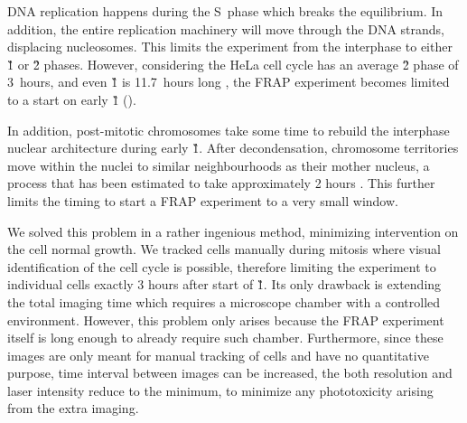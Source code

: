       DNA replication happens during the S~phase which breaks the equilibrium.
      In addition, the entire replication machinery will move through the DNA
      strands, displacing nucleosomes. This limits the experiment from the
      interphase to either \G1{} or \G2{} phases. However, considering
      the HeLa cell cycle has an average \G2{} phase of 3~hours, and even
      \G1{} is 11.7~hours long \citep{HeLaCellCycle}, the FRAP experiment
      becomes limited to a start on early \G1{} ().


      In addition, post-mitotic chromosomes take some time to rebuild the
      interphase nuclear architecture during early \G1{}. After decondensation,
      chromosome territories move within the nuclei to similar neighbourhoods
      as their mother nucleus, a process that has been estimated to
      take approximately 2 hours
      \citep{visualizationG1chromosomes,earlyg1position,RelativeChromosomePosition}.
      This further limits the timing to start a FRAP experiment to a very
      small window.

      We solved this problem in a rather ingenious method, minimizing
      intervention on the cell normal growth. We tracked cells manually during
      mitosis where visual identification of the cell cycle is possible,
      therefore limiting the experiment to individual cells exactly 3 hours
      after start of \G1{}.
      Its only drawback is extending the total imaging time which
      requires a microscope chamber with a controlled environment.
      However, this problem only arises because the FRAP experiment itself
      is long enough to already require such chamber. Furthermore, since these
      images are only meant for manual tracking of cells and have no
      quantitative purpose, time interval between images can be increased,
      the both resolution and laser intensity reduce to the minimum, to
      minimize any phototoxicity arising from the extra imaging.


